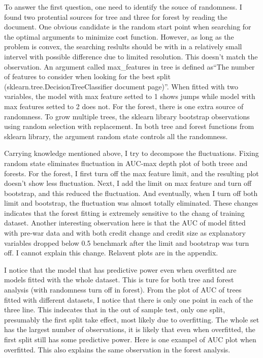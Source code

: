 \documentclass{article}
\begin{document}
To answer the first question, one need to identify the souce of
randomness. I found two protential sources for tree and three for
forest by reading the document. One obvious candidate is the random start point when searching
for the optimal arguments to minimize cost function. However, as long as
the problem is convex, the searching reslults should be with in a
relatively small intervel with possible difference due to limited resolution. This
doesn't match the observation. An argument
called max\_features in tree is defined as``The number of features to consider when
looking for the best split (sklearn.tree.DecisionTreeClassifier document
page)''. When fitted with two variables, the model with max
feature setted to 1 shows jumps while model with max features setted to 2 does not. For the forest, there is one extra
source of randomness. To grow multiple trees, the sklearn library
bootstrap observations using random selection with replacement. In both tree
and forest functions from sklearn library, the argument random state controls all the
randomness.

Carrying knowledge mentioned above, I try to decompose the fluctuations.
Fixing random state eliminates fluctuation in
AUC-max depth plot of both treee and forests. For the forest, I first turn off the max
feature limit, and the resulting plot doesn't show less fluctuation.
Next, I add the limit on max feature and turn off bootstrap, and
this reduced the fluctuation. And eventually, when I turn off both limit
and bootstrap, the fluctuation was almost totally eliminated. These
changes indicates that the
forest fitting is extremely sensitive to the chang of training dataset.
Another interesting observation here is that the AUC of model fitted
with pre-war data and with both credit change and credit size as
explanatory variables dropped below 0.5 benchmark after the limit and
bootstrap was turn off. I cannot explain this change. Relavent plots are in the appendix.

I notice that the model that has
predictive power even when overfitted are models fitted with the whole
dataset. This is ture for both tree and forest analysis (with
randomness turn off in forest). From the plot of AUC of trees fitted
with different datasets, I notice that there is only one point in each
of the three line. This indecates that in the out of sample test, only
one split, presumably the first split take effect, most likely due to
overfitting. The whole set has the largest number of observations, it is likely that
even when overfitted, the first split still has some predictive power. Here
is one exampel of AUC plot when overfitted. This also explains the same
observation in the forest analysis.
\end{document}
